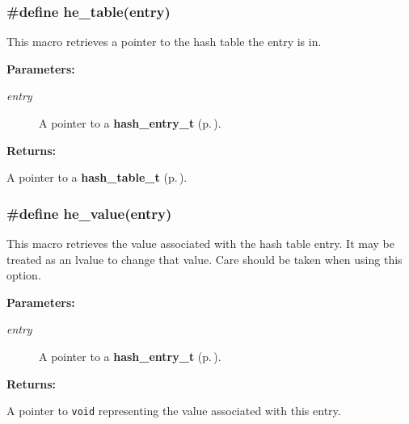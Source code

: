 \subsubsection{\setlength{\rightskip}{0pt plus 5cm}\#define he\_\-table(entry)}\label{group__dbprim__hash_a33}




 This macro retrieves a pointer to the hash table the entry is in.\begin{Desc}
\item[{\bf Parameters: }]\par
\begin{description}
\item[
{\em entry}]A pointer to a {\bf hash\_\-entry\_\-t} {\rm (p.\,\pageref{group__dbprim__hash_a1})}.

\end{description}
\end{Desc}
\begin{Desc}
\item[{\bf Returns: }]\par
A pointer to a {\bf hash\_\-table\_\-t} {\rm (p.\,\pageref{group__dbprim__hash_a0})}. \end{Desc}
\subsubsection{\setlength{\rightskip}{0pt plus 5cm}\#define he\_\-value(entry)}\label{group__dbprim__hash_a36}




 This macro retrieves the value associated with the hash table entry. It may be treated as an lvalue to change that value. Care should be taken when using this option.\begin{Desc}
\item[{\bf Parameters: }]\par
\begin{description}
\item[
{\em entry}]A pointer to a {\bf hash\_\-entry\_\-t} {\rm (p.\,\pageref{group__dbprim__hash_a1})}.

\end{description}
\end{Desc}
\begin{Desc}
\item[{\bf Returns: }]\par
A pointer to {\tt void} representing the value associated with this entry. \end{Desc}
